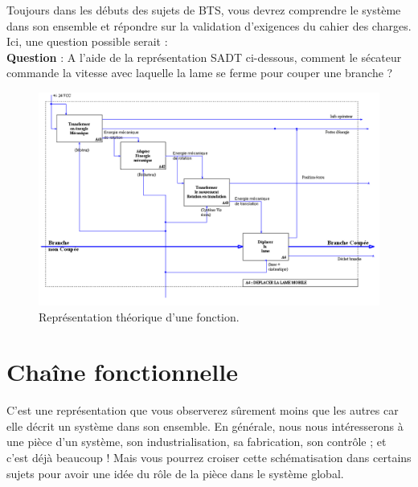 \documentclass[
	11pt, %
	fleqn, %
	a4paper, %
]{LegrandOrangeBook}
\begin{document}
Toujours dans les débuts des sujets de BTS, vous devrez comprendre le système dans son ensemble et répondre sur la validation d'exigences du cahier des charges. Ici, une question possible serait :\\
\textbf{Question} : A l'aide de la représentation SADT ci-dessous, comment le sécateur commande la vitesse avec laquelle la lame se ferme pour couper une branche ?



\begin{figure}[H] %
	\centering %
	\includegraphics[width=1.1\textwidth]{Images/seca2.png} %
	\caption{Représentation théorique d'une fonction.}
	\label{seca2} %
\end{figure}


\section{Chaîne fonctionnelle}
C'est une représentation que vous observerez sûrement moins que les autres car elle décrit un système dans son ensemble. En générale, nous nous intéresserons à une pièce d'un système,  son industrialisation, sa fabrication, son contrôle ; et c'est déjà beaucoup ! Mais vous pourrez croiser cette schématisation dans certains sujets pour avoir une idée du rôle de la pièce dans le système global.
\end{document}

